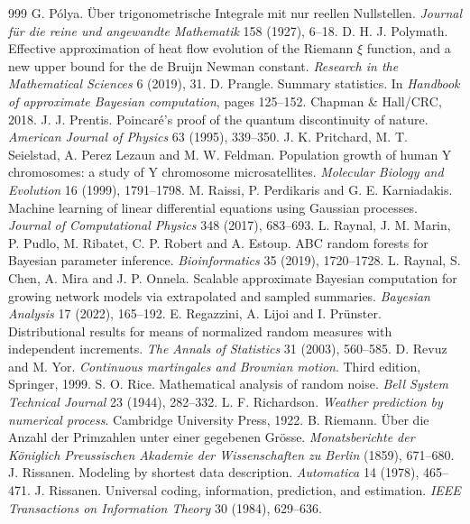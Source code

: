 \begin{thebibliography}{999}
 G. P\'olya. \"Uber trigonometrische Integrale mit nur reellen Nullstellen. \emph{Journal f\"ur die reine und angewandte Mathematik} 158 (1927), 6--18.
 D. H. J. Polymath. Effective approximation of heat flow evolution of the Riemann $\xi$ function, and a new upper bound for the de Bruijn Newman constant. \emph{Research in the Mathematical Sciences} 6 (2019), 31.
 D. Prangle. Summary statistics. In \emph{Handbook of approximate Bayesian computation}, pages 125--152. Chapman \& Hall/CRC, 2018.
 J. J. Prentis. Poincar\'e's proof of the quantum discontinuity of nature. \emph{American Journal of Physics} 63 (1995), 339--350.
 J. K. Pritchard, M. T. Seielstad, A. Perez Lezaun and M. W. Feldman. Population growth of human Y chromosomes: a study of Y chromosome microsatellites. \emph{Molecular Biology and Evolution} 16 (1999), 1791--1798.
 M. Raissi, P. Perdikaris and G. E. Karniadakis. Machine learning of linear differential equations using Gaussian processes. \emph{Journal of Computational Physics} 348 (2017), 683--693.
 L. Raynal, J. M. Marin, P. Pudlo, M. Ribatet, C. P. Robert and A. Estoup. ABC random forests for Bayesian parameter inference. \emph{Bioinformatics} 35 (2019), 1720--1728.
 L. Raynal, S. Chen, A. Mira and J. P. Onnela. Scalable approximate Bayesian computation for growing network models via extrapolated and sampled summaries. \emph{Bayesian Analysis} 17 (2022), 165--192.
 E. Regazzini, A. Lijoi and I. Pr\"unster. Distributional results for means of normalized random measures with independent increments. \emph{The Annals of Statistics} 31 (2003), 560--585.
 D. Revuz and M. Yor. \emph{Continuous martingales and Brownian motion}. Third edition, Springer, 1999.
 S. O. Rice. Mathematical analysis of random noise. \emph{Bell System Technical Journal} 23 (1944), 282--332.
 L. F. Richardson. \emph{Weather prediction by numerical process}. Cambridge University Press, 1922.
 B. Riemann. \"Uber die Anzahl der Primzahlen unter einer gegebenen Gr\"osse. \emph{Monatsberichte der K\"oniglich Preussischen Akademie der Wissenschaften zu Berlin} (1859), 671--680.
 J. Rissanen. Modeling by shortest data description. \emph{Automatica} 14 (1978), 465--471.
 J. Rissanen. Universal coding, information, prediction, and estimation. \emph{IEEE Transactions on Information Theory} 30 (1984), 629--636.

\end{thebibliography}
